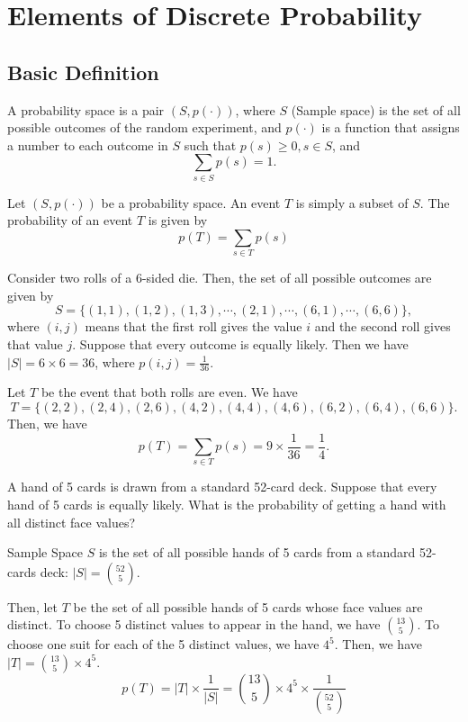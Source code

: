 \chapter{Elements of Discrete Probability}

\section{Basic Definition}
\begin{definition}
    A probability space is a pair \((S, p(\cdot))\), where \(S\) (Sample space) is the set of all possible outcomes of the random experiment, and \(p(\cdot)\) is a function that assigns a number to each outcome in \(S\) such that \(p(s) \geq 0, s \in S\), and
    \[
        \sum_{s \in S} p(s) = 1.
    \]
\end{definition}

\begin{definition}
    Let \((S, p(\cdot))\) be a probability space. An event \(T\) is simply a subset of \(S\). The probability of an event \(T\) is given by
    \[
        p(T) = \sum_{s \in T} p(s)
    \]
\end{definition}

\begin{eg}
Consider two rolls of a 6-sided die. Then, the set of all possible outcomes are given by
\[
    S = \{(1, 1), (1, 2), (1, 3), \cdots, (2, 1), \cdots, (6, 1), \cdots, (6, 6)\},
\]
where \((i, j)\) means that the first roll gives the value \(i\) and the second roll gives that value \(j\). Suppose that every outcome is equally likely. Then we have \(\vert S \vert = 6 \times 6 = 36\), where \(p(i, j) = \frac{1}{36}\).

Let \(T\) be the event that both rolls are even. We have
\[
    T = \{(2, 2), (2, 4), (2, 6), (4, 2), (4, 4), (4, 6), (6, 2), (6, 4), (6, 6)\}. 
\]
Then, we have
\[
    p(T) = \sum_{s \in T} p(s) = 9 \times \dfrac{1}{36} = \dfrac{1}{4}.
\]
\end{eg}

\begin{eg}[Poker]
A hand of 5 cards is drawn from a standard 52-card deck. Suppose that every hand of 5 cards is equally likely. What is the probability of getting a hand with all distinct face values?

Sample Space \(S\) is the set of all possible hands of 5 cards from a standard 52-cards deck: \(\vert S \vert = \binom{52}{5}\). 

Then, let \(T\) be the set of all possible hands of 5 cards whose face values are distinct. To choose 5 distinct values to appear in the hand, we have \(\binom{13}{5}\). To choose one suit for each of the 5 distinct values, we have \(4^5\). Then, we have 
\(\vert T \vert = \binom{13}{5} \times 4^5\).
\[
    p(T) = \vert T \vert \times \dfrac{1}{\vert S \vert } = \binom{13}{5} \times 4^5 \times \dfrac{1}{\binom{52}{5}}
\]
\end{eg}

